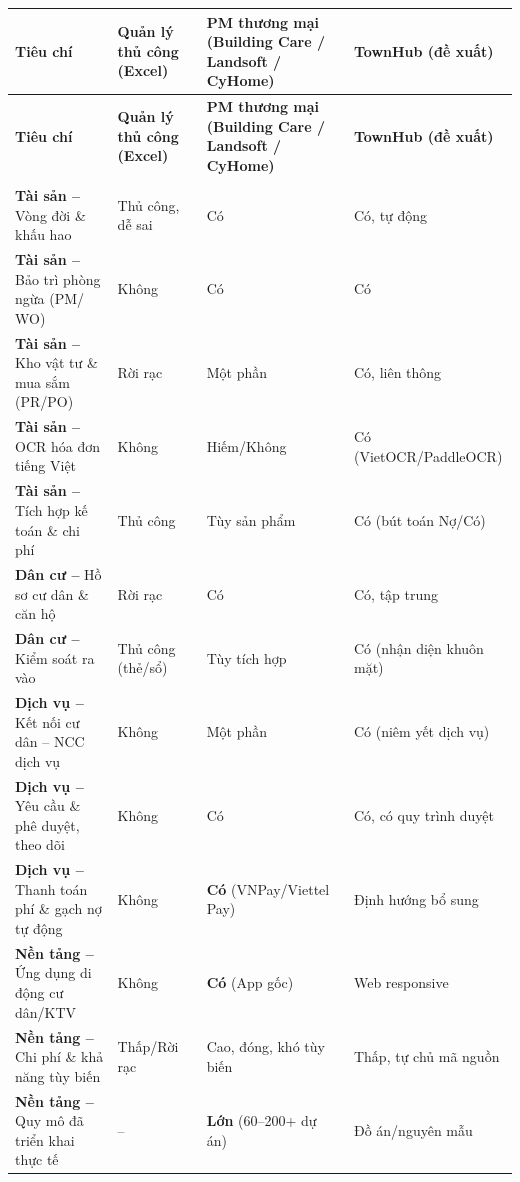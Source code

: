 {\singlespacing\renewcommand{\arraystretch}{1.25}
\begin{longtable}{|>{\raggedright\arraybackslash}p{}|>{\raggedright\arraybackslash}p{}|>{\raggedright\arraybackslash}p{}|>{\raggedright\arraybackslash}p{}|}
\hline
\textbf{Tiêu chí} & \textbf{Quản lý thủ công (Excel)} & \textbf{PM thương mại (Building Care / Landsoft / CyHome)} & \textbf{TownHub (đề xuất)} \\ \hline
\endfirsthead
\hline
\textbf{Tiêu chí} & \textbf{Quản lý thủ công (Excel)} & \textbf{PM thương mại (Building Care / Landsoft / CyHome)} & \textbf{TownHub (đề xuất)} \\ \hline
\endhead
\hline \multicolumn{4}{r}{\footnotesize\textit{(tiếp trang sau)}} \\
\endfoot
\endlastfoot
\textbf{Tài sản – }Vòng đời \& khấu hao & Thủ công, dễ sai & Có & Có, tự động \\ \hline
\textbf{Tài sản – }Bảo trì phòng ngừa (PM/​WO) & Không & Có & Có \\ \hline
\textbf{Tài sản – }Kho vật tư \& mua sắm (PR/​PO) & Rời rạc & Một phần & Có, liên thông \\ \hline
\textbf{Tài sản – }OCR hóa đơn tiếng Việt & Không & Hiếm/Không & Có (VietOCR/PaddleOCR) \\ \hline
\textbf{Tài sản – }Tích hợp kế toán \& chi phí & Thủ công & Tùy sản phẩm & Có (bút toán Nợ/Có) \\ \hline
\textbf{Dân cư – }Hồ sơ cư dân \& căn hộ & Rời rạc & Có & Có, tập trung \\ \hline
\textbf{Dân cư – }Kiểm soát ra vào & Thủ công (thẻ/sổ) & Tùy tích hợp & Có (nhận diện khuôn mặt) \\ \hline
\textbf{Dịch vụ – }Kết nối cư dân – NCC dịch vụ & Không & Một phần & Có (niêm yết dịch vụ) \\ \hline
\textbf{Dịch vụ – }Yêu cầu \& phê duyệt, theo dõi & Không & Có & Có, có quy trình duyệt \\ \hline
\textbf{Dịch vụ – }Thanh toán phí \& gạch nợ tự động & Không & \textbf{Có} (VNPay/Viettel Pay) & Định hướng bổ sung \\ \hline
\textbf{Nền tảng – }Ứng dụng di động cư dân/KTV & Không & \textbf{Có} (App gốc) & Web responsive \\ \hline
\textbf{Nền tảng – }Chi phí \& khả năng tùy biến & Thấp/Rời rạc & Cao, đóng, khó tùy biến & Thấp, tự chủ mã nguồn \\ \hline
\textbf{Nền tảng – }Quy mô đã triển khai thực tế & -- & \textbf{Lớn} (60–200+ dự án) & Đồ án/nguyên mẫu \\ \hline
\end{longtable}}

